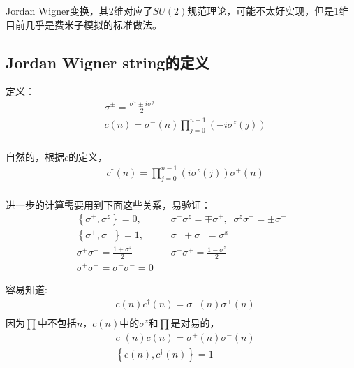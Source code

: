Jordan Wigner变换，其2维对应了$SU(2)$规范理论，可能不太好实现，但是1维目前几乎是费米子模拟的标准做法。

\subsection{Jordan Wigner string的定义}

定义：
\begin{equation}
\begin{split}
&\sigma ^{\pm} = \frac{\sigma ^x \pm i \sigma ^y}{2}\\
&c(n)=\sigma ^-(n)\prod _{j=0}^{n-1}\left(-i\sigma ^z(j)\right)\\
\end{split}
\end{equation}

自然的，根据$c$的定义，
\begin{equation}
\begin{split}
&c^{\dagger}(n)=\prod _{j=0}^{n-1}\left(i\sigma ^z(j)\right)\sigma ^+(n)\\
\end{split}
\end{equation}

进一步的计算需要用到下面这些关系，易验证：
\begin{equation}
\begin{split}
\left\{\sigma ^{\pm}, \sigma ^z\right\}=0,\quad & \sigma ^{\pm}\sigma ^z = \mp \sigma ^{\pm},\;\;\sigma ^z\sigma ^{\pm} = \pm \sigma ^{\pm}\\
\left\{\sigma ^+, \sigma ^-\right\}=1, \quad & \sigma ^++\sigma ^- = \sigma ^x\\
\sigma ^+\sigma ^- = \frac{1+\sigma ^z}{2} \quad & \sigma ^-\sigma ^+ = \frac{1-\sigma ^z}{2}\\
\sigma^+\sigma^+=\sigma^-\sigma^-=0 \quad & 
\end{split}
\end{equation}

容易知道:
\begin{equation}
\begin{split}
&c(n) c^{\dagger}(n) = \sigma ^-(n)\sigma ^+(n)\\
\end{split}
\end{equation}
因为$\prod $中不包括$n$，$c(n)$中的$\sigma ^z$和$\prod$是对易的，
\begin{equation}
\begin{split}
&c^{\dagger}(n) c(n) = \sigma ^+(n)\sigma ^-(n)\\
&\left\{ c(n),c^{\dagger}(n)\right\} = 1\\
\end{split}
\end{equation}

